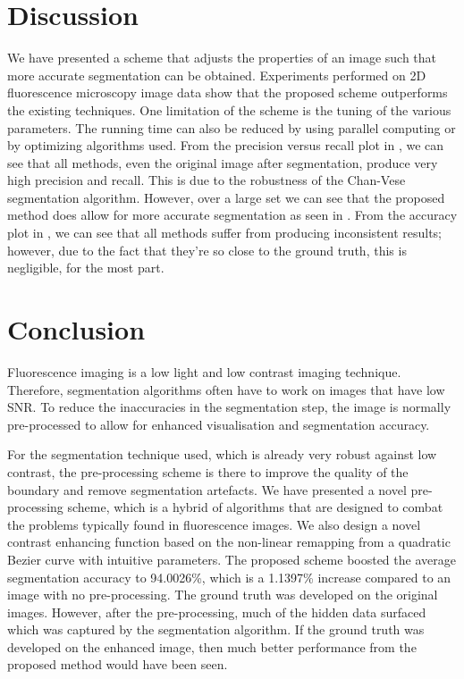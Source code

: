 \section{Discussion}
\label{sec:preprocessschemediscussion}

We have presented a scheme that adjusts the properties of an image such that more accurate segmentation can be obtained. Experiments performed on 2D fluorescence microscopy image data show that the proposed scheme outperforms the existing techniques. One limitation of the scheme is the tuning of the various parameters. The running time can also be reduced by using parallel computing or by optimizing algorithms used. From the precision versus recall plot in , we can see that all methods, even the original image after segmentation, produce very high precision and recall. This is due to the robustness of the Chan-Vese segmentation algorithm. However, over a large set we can see that the proposed method does allow for more accurate segmentation as seen in . From the accuracy plot in , we can see that all methods suffer from producing inconsistent results; however, due to the fact that they're so close to the ground truth, this is negligible, for the most part.


\section{Conclusion}
\label{sec:preprocessschemeconclusion}

Fluorescence imaging is a low light and low contrast imaging technique. Therefore, segmentation algorithms often have to work on images that have low SNR. To reduce the inaccuracies in the segmentation step, the image is normally pre-processed to allow for enhanced visualisation and segmentation accuracy.

For the segmentation technique used, which is already very robust against low contrast, the pre-processing scheme is there to improve the quality of the boundary and remove segmentation artefacts. We have presented a novel pre-processing scheme, which is a hybrid of algorithms that are designed to combat the problems typically found in fluorescence images. We also design a novel contrast enhancing function based on the non-linear remapping from a quadratic Bezier curve with intuitive parameters.
The proposed scheme boosted the average segmentation accuracy to 94.0026\%, which is a 1.1397\% increase compared to an image with no pre-processing. The ground truth was developed on the original images. However, after the pre-processing, much of the hidden data surfaced which was captured by the segmentation algorithm. If the ground truth was developed on the enhanced image, then much better performance from the proposed method would have been seen.
